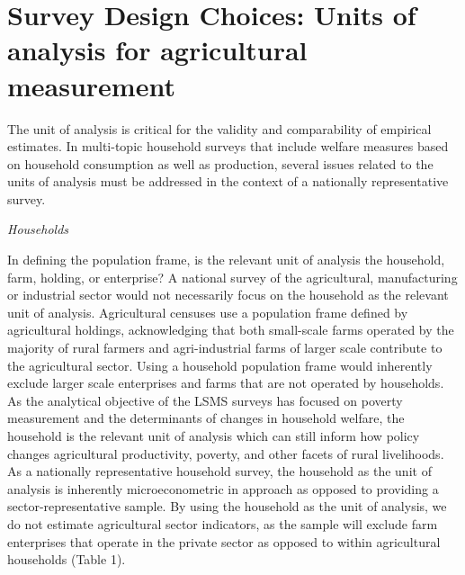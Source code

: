 \documentclass[
]{book}
\begin{document}
\hypertarget{survey-design-choices-units-of-analysis-for-agricultural-measurement}{%
\section{Survey Design Choices: Units of analysis for agricultural measurement}\label{survey-design-choices-units-of-analysis-for-agricultural-measurement}}

The unit of analysis is critical for the validity and comparability of empirical estimates. In multi-topic household surveys that include welfare measures based on household consumption as well as production, several issues related to the units of analysis must be addressed in the context of a nationally representative survey.

\emph{Households}

In defining the population frame, is the relevant unit of analysis the household, farm, holding, or enterprise? A national survey of the agricultural, manufacturing or industrial sector would not necessarily focus on the household as the relevant unit of analysis. Agricultural censuses use a population frame defined by agricultural holdings, acknowledging that both small-scale farms operated by the majority of rural farmers and agri-industrial farms of larger scale contribute to the agricultural sector. Using a household population frame would inherently exclude larger scale enterprises and farms that are not operated by households. As the analytical objective of the LSMS surveys has focused on poverty measurement and the determinants of changes in household welfare, the household is the relevant unit of analysis which can still inform how policy changes agricultural productivity, poverty, and other facets of rural livelihoods. As a nationally representative household survey, the household as the unit of analysis is inherently microeconometric in approach as opposed to providing a sector-representative sample. By using the household as the unit of analysis, we do not estimate agricultural sector indicators, as the sample will exclude farm enterprises that operate in the private sector as opposed to within agricultural households (Table 1).
\end{document}
